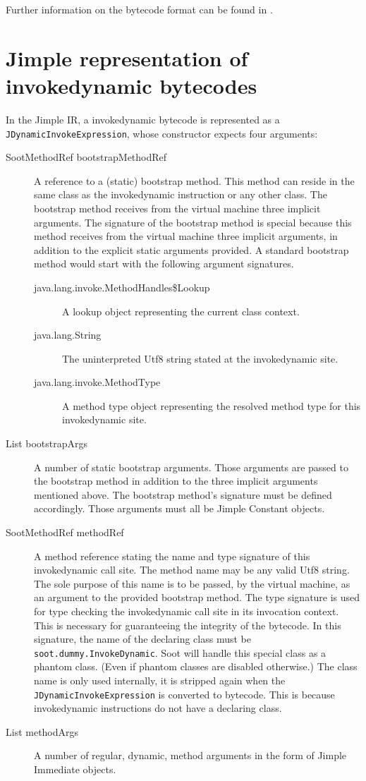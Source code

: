\documentclass{article}
\newcommand{\id}{invokedynamic\xspace}
\begin{document}
Further information on the bytecode format can be found in
.

\section{Jimple representation of invokedynamic bytecodes}

In the Jimple IR, a invokedynamic bytecode is represented as a
\texttt{JDynamicInvokeExpression}, whose constructor expects four arguments:

\begin{description}
  \item[SootMethodRef bootstrapMethodRef] A reference to a (static)
  bootstrap method. This method can reside in the same class as the \id instruction or any
  other class. The bootstrap method receives from the virtual machine three
  implicit arguments. The signature of the bootstrap method is special because
  this method receives from the virtual machine three implicit arguments,
  in addition to the explicit static arguments provided. A standard bootstrap
  method would start with the following argument signatures.
  \begin{description}
  \item[java.lang.invoke.MethodHandles\$Lookup] A lookup object representing the
  current class context.
  \item[java.lang.String] The uninterpreted Utf8 string stated at the \id site.
  \item[java.lang.invoke.MethodType] A method type object representing the
  resolved method type for this \id site.
  \end{description}
  \item[List bootstrapArgs] A number of static bootstrap arguments. Those
  arguments are passed to the bootstrap method in addition to the three implicit
  arguments mentioned above. The bootstrap method's signature must be defined
  accordingly. Those arguments must all be Jimple Constant objects.
  \item[SootMethodRef methodRef] A method reference stating the name and type
  signature of this \id call site. The method name may be any valid Utf8 string.
  The sole purpose of this name is to be passed, by the virtual machine, as an
  argument to the provided bootstrap method. The type signature is used for type
  checking the \id call site in its invocation context. This is necessary for
  guaranteeing the integrity of the bytecode.
  In this signature, the name of the declaring class must be
  \texttt{soot.dummy.InvokeDynamic}.
  Soot will handle this special class as a phantom class. (Even if phantom
  classes are disabled otherwise.) The class name is only used internally, it is
  stripped again when the \texttt{JDynamicInvokeExpression} is converted to bytecode. This is because
  invokedynamic instructions do not have a declaring class. 
  \item[List methodArgs] A number of regular, dynamic, method arguments in the
  form of Jimple Immediate objects.
\end{description}
\end{document}
